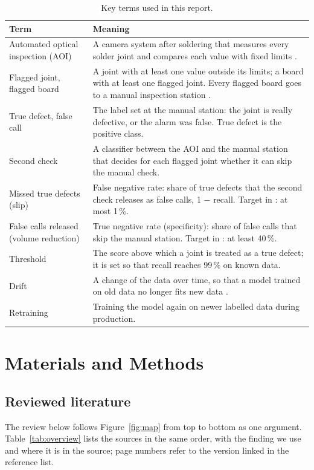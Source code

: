 \documentclass[11pt,a4paper]{article}
\begin{document}
\begin{table}[h]
\centering\small
\caption{Key terms used in this report.}
\label{tab:terms}
\begin{tabularx}{\textwidth}{@{}p{4.2cm}L@{}}
\toprule
Term & Meaning \\
\midrule
Automated optical inspection (AOI) & A camera system after soldering that measures every solder joint and compares each value with fixed limits \cite{ebayyeh2020}. \\
Flagged joint, flagged board & A joint with at least one value outside its limits; a board with at least one flagged joint. Every flagged board goes to a manual inspection station \cite{pfab2024}. \\
True defect, false call & The label set at the manual station: the joint is really defective, or the alarm was false. True defect is the positive class. \\
Second check & A classifier between the AOI and the manual station that decides for each flagged joint whether it can skip the manual check. \\
Missed true defects (slip) & False negative rate: share of true defects that the second check releases as false calls, 1 $-$ recall. Target in \cite{pfab2025}: at most 1\,\%. \\
False calls released (volume reduction) & True negative rate (specificity): share of false calls that skip the manual station. Target in \cite{pfab2025}: at least 40\,\%. \\
Threshold & The score above which a joint is treated as a true defect; it is set so that recall reaches 99\,\% on known data. \\
Drift & A change of the data over time, so that a model trained on old data no longer fits new data \cite{gama2014}. \\
Retraining & Training the model again on newer labelled data during production. \\
\bottomrule
\end{tabularx}
\end{table}

\section{Materials and Methods}

\subsection{Reviewed literature}
The review below follows Figure~\ref{fig:map} from top to bottom as one argument. Table~\ref{tab:overview} lists the sources in the same order, with the finding we use and where it is in the source; page numbers refer to the version linked in the reference list.
\end{document}
